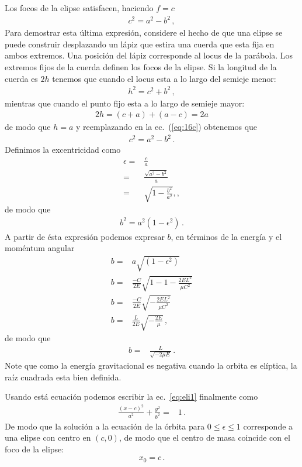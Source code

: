 Los focos de la elipse satisfacen, haciendo $f=c$
\begin{align}
  \label{eq:14c}
  c^2=a^2-b^2\,,
\end{align}
Para demostrar esta última expresión, considere el hecho de que una elipse se puede construir desplazando un lápiz que estira una cuerda que esta fija en ambos extremos. Una posición del lápiz corresponde al locus de la parábola. Los extremos fijos de la cuerda definen los focos de la elipse. Si la longitud de la cuerda es $2h$ tenemos que cuando el locus esta a lo largo del semieje menor:
\begin{align}
  \label{eq:16c}
h^2=c^2+b^2\,,
\end{align}
mientras que cuando el punto fijo esta a lo largo de semieje mayor:
\begin{align}
  2h=(c+a)+(a-c)=2a
\end{align}
de modo que $h=a$ y reemplazando en la ec.~(\ref{eq:16c}) obtenemos que
\begin{align}
  c^2=a^2-b^2\,.
\end{align}
Definimos la excentricidad como
\begin{align}
  \epsilon=&\frac{c}{a}\nonumber\\
  =&\frac{\sqrt{a^2-b^2}}{a}\nonumber\\
  =&\sqrt{1-\frac{b^2}{a^2}},,
\end{align}
de modo que
\begin{align}
  b^2=a^2(1-\epsilon^2)\,.
\end{align}
A partir de ésta expresión podemos expresar $b$, en términos de la energía y el moméntum angular
\begin{align*}
  b=&a\sqrt{(1-\epsilon^2)}\nonumber\\
  b=&\frac{-C}{2E}\sqrt{1-1-\frac{2EL^2}{\mu C^2}}\nonumber\\
  b=&\frac{-C}{2E}\sqrt{-\frac{2EL^2}{\mu C^2}}\nonumber\\
  b=&\frac{L}{2E}\sqrt{-\frac{2E}{\mu}}\,,
\end{align*}
de modo que
\begin{align}
  \label{eq:b}
  b=&\frac{L}{\sqrt{-2\mu E}}\,.
\end{align}
Note que como la energía gravitacional es negativa cuando la orbita es elíptica, la raíz cuadrada esta bien definida.

Usando está ecuación podemos escribir la ec.~\eqref{eq:eli1} finalmente como
\begin{align}
  \frac{(x-c)^2}{a^2}+\frac{y^2}{b^2}=&1\,.
\end{align}
De modo que la solución a la ecuación de la órbita para $0\le\epsilon\le 1$ corresponde a una elipse con centro en $(c,0)$, de modo que el centro de masa coincide con el foco de la elipse:
\begin{align}
  x_0=c\,.
\end{align}

